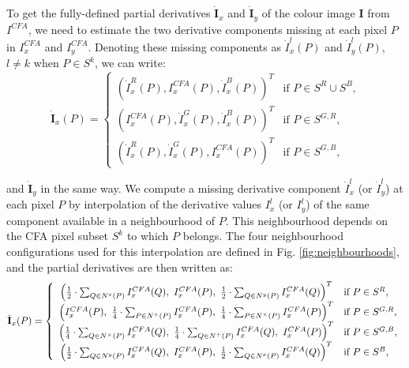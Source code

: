 \documentclass[twoside]{article}
\newcommand\point{\stackrel{.}}
\begin{document}
To get the fully-defined partial derivatives $\dot{\textbf{I}}_x$ and $\dot{\textbf{I}}_y$ of the colour image $\mathbf{I}$ from $I^{CFA}$, we need to estimate the two derivative components missing at each pixel $P$ in $I^{CFA}_x$ and $I^{CFA}_y$. Denoting these missing components as $\dot{I}_x^l(P)$ and $\dot{I}_y^l(P)$, $l \neq k$ when $P \in S^k$, we can write:
\begin{equation}
	\dot{\textbf{I}}_x(P) = \left\lbrace
	\begin{array}{cl}
		\left( \dot{I}^R_x(P), I^{CFA}_x(P), \dot{I}^B_x(P) \right)^T & \text{if $P \in S^R \cup S^B$,}\\
		\left( I^{CFA}_x(P), \dot{I}^G_x(P), \dot{I}^B_x(P) \right)^T & \text{if $P \in S^{G,R}$,}\\
		\left( \dot{I}^R_x(P), \dot{I}^G_x(P), I^{CFA}_x(P) \right)^T & \text{if $P \in S^{G,B}$,}
	\end{array}\right.
	\label{eq:I_p_x}
\end{equation}

\noindent and $\dot{\textbf{I}}_y$ in the same way. We compute a missing derivative component $\dot{I}_{x}^l$ (or $\dot{I}_{y}^l$) at each pixel $P$ by interpolation of the derivative values $I_{x}^l$ (or $I_{y}^l$) of the same component available in a neighbourhood of $P$. This neighbourhood depends on the CFA pixel subset $S^k$ to which $P$ belongs. The four neighbourhood configurations used for this interpolation are defined in Fig. \ref{fig:neighbourhoods}, and the partial derivatives are then written as:
\begin{equation}
	\dot{\textbf{I}}_x(P) = \left\lbrace
	\begin{array}{cl}
		\left( \frac{1}{2}\cdot\sum_{Q \in N^{x}(P)} I^{CFA}_x(Q),~I^{CFA}_x(P),~\frac{1}{2}\cdot\sum_{Q \in N^{y}(P)} I^{CFA}_x(Q) \right)^T & \text{if $P \in S^R$,} \\
		\left( I^{CFA}_x(P),~\frac{1}{4}\cdot\sum_{P \in N^{+}(P)} I^{CFA}_x(P),~\frac{1}{4}\cdot\sum_{P \in N^{\times}(P)} I^{CFA}_x(P) \right)^T & \text{if $P \in S^{G,R}$,}\\
		\left( \frac{1}{4}\cdot\sum_{Q \in N^{\times}(P)} I^{CFA}_x(Q),~\frac{1}{4}\cdot\sum_{Q \in N^{+}(P)} I^{CFA}_x(Q),~I^{CFA}_x(P) \right)^T & \text{if $P \in S^{G,B}$,}\\
		\left( \frac{1}{2}\cdot\sum_{Q \in N^{y}(P)} I^{CFA}_x(Q),~I^{CFA}_x(P),~\frac{1}{2}\cdot\sum_{Q \in N^{x}(P)} I^{CFA}_x(Q) \right)^T & \text{if $P \in S^B$,}
	\end{array}\right.
	\label{eq:I_p_x_full}
\end{equation}
\end{document}
